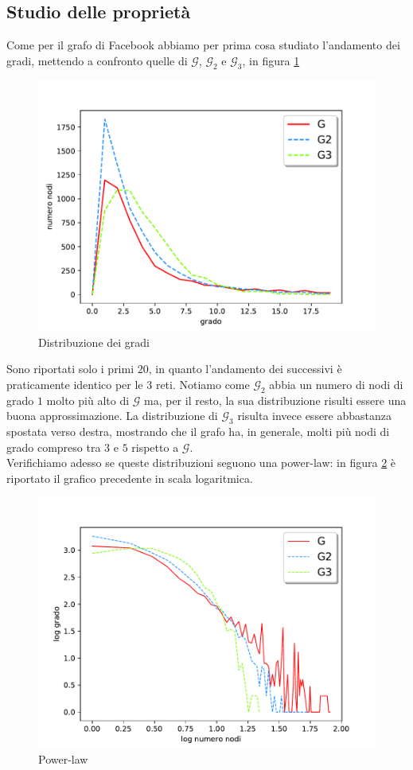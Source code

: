 \documentclass[12pt]{scrartcl}
\begin{document}
\subsection{Studio delle proprietà}
Come per il grafo di Facebook abbiamo per prima cosa studiato l'andamento dei gradi, mettendo a confronto quelle di $\mathcal{G}$, $\mathcal{G}_2$ e $\mathcal{G}_3$, in figura \ref{fig:fig6}
\begin{figure}[H]
	\centering
	\includegraphics[width=0.7\linewidth]{imgs/Figure_6.pdf}
	\caption{Distribuzione dei gradi}\label{fig:fig6}
\end{figure}

Sono riportati solo i primi $20$, in quanto l'andamento dei successivi è praticamente identico per le $3$ reti. Notiamo come $\mathcal{G}_2$ abbia un numero di nodi di grado $1$ molto più alto di $\mathcal{G}$ ma, per il resto, la sua distribuzione risulti essere una buona approssimazione. La distribuzione di $\mathcal{G}_3$ risulta invece essere abbastanza spostata verso destra, mostrando che il grafo ha, in generale, molti più nodi di grado compreso tra $3$ e $5$ rispetto a $\mathcal{G}$.\\
Verifichiamo adesso se queste distribuzioni seguono una power-law: in figura \ref{fig:fig7} è riportato il grafico precedente in scala logaritmica.

\begin{figure}[H]
	\centering
	\includegraphics[width=0.7\linewidth]{imgs/Figure_7.pdf}
	\caption{Power-law}\label{fig:fig7}
\end{figure}
\end{document}
